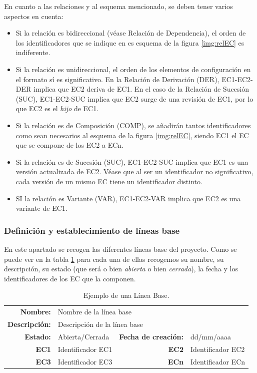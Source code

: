 \par En cuanto a las relaciones y al esquema mencionado, se deben tener varios aspectos en cuenta:
\begin{itemize}[-]
  \item Si la relación es bidireccional (véase Relación de Dependencia), el orden de los identificadores que se indique en es esquema de la figura \ref{img:relEC} es indiferente.
  \item Si la relación es unidireccional, el orden de los elementos de configuración en el formato sí es significativo. En la Relación de Derivación (DER), EC1-EC2-DER implica que EC2 deriva de EC1. En el caso de la Relación de Sucesión (SUC), EC1-EC2-SUC implica que EC2 surge de una revisión de EC1, por lo que EC2 es el \textit{hijo} de EC1.
  \item Si la relación es de Composición (COMP), se añadirán tantos identificadores como sean necesarios al esquema de la figura \ref{img:relEC}, siendo EC1 el EC que se compone de los EC2 a ECn.
  \item Si la relación es de Sucesión (SUC), EC1-EC2-SUC implica que EC1 es una versión actualizada de EC2. Véase que al ser un identificador no significativo, cada versión de un mismo EC tiene un identificador distinto.
  \item SI la relación es Variante (VAR), EC1-EC2-VAR implica que EC2 es una variante de EC1.
\end{itemize}



\subsubsection{Definición y establecimiento de líneas base}
\par En este apartado se recogen las diferentes líneas base del proyecto. Como se puede ver en la tabla \ref{tab:baseLine} para cada una de ellas recogemos su nombre, su descripción, su estado (que será o bien \textit{abierta} o bien \textit{cerrada}), la fecha y los identificadores de los EC que la componen.

\begin{table}[h]
\begin{center}
\begin{tabular}{ r l | r l }
\hline
\textbf{Nombre:} & \multicolumn{3}{l}{Nombre de la línea base} \\
\textbf{Descripción:} & \multicolumn{3}{l}{Descripción de la línea base} \\ \hline \hline
\textbf{Estado:} & Abierta/Cerrada & \textbf{Fecha de creación:} & dd/mm/aaaa \\
\textbf{EC1} & Identificador EC1 & \textbf{EC2} & Identificador EC2 \\
\textbf{EC3} & Identificador EC3 & \textbf{ECn} & Identificador ECn \\
\hline
\end{tabular}
\caption{Ejemplo de una Línea Base.}
\label{tab:baseLine}
\end{center}
\end{table}

